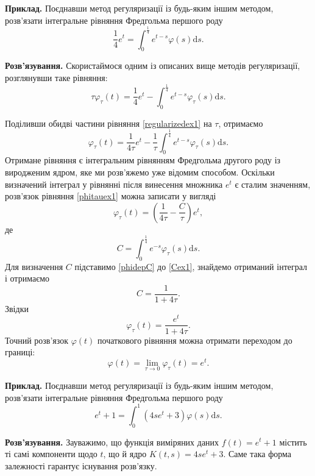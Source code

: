 \documentclass[14pt,twoside]{extreport}
\theoremstyle{mystyle}
\numberwithin{equation}{chapter}
\begin{document}
\begin{small}
\textbf{Приклад.} Поєднавши метод регуляризації із будь-яким іншим методом, розв'язати інтегральне рівняння Фредгольма першого роду
\[
\displaystyle \frac{1}{4}e^{t}=\int_{0}^{\frac{1}{4}}e^{t-s} \varphi(s)\mathrm{d}s.
\]

\textbf{Розв'язування.}
Скористаймося одним із описаних вище методів регуляризації, розглянувши таке рівняння:
\begin{equation}\label{regularizedex1}
 \tau \varphi_{\tau}(t) = \frac{1}{4}e^{t} - \int_{0}^{\frac{1}{4}}e^{t-s} \varphi_{\tau}(s)\mathrm{d}s.
\end{equation}

Поділивши обидві частини рівняння \eqref{regularizedex1} на $\tau$, отримаємо
\begin{equation}\label{phitauex1}
\varphi_{\tau}(t)=\displaystyle \frac{1}{4\tau}e^{t}-\frac{1}{\tau}\int_{0}^{\frac{1}{4}}e^{t-s}\varphi_{\tau}(s)\mathrm{d}s.
\end{equation}
Отримане рівняння є інтегральним рівнянням Фредгольма другого роду із виродженим ядром, яке ми розв'яжемо уже відомим способом. Оскільки визначений інтеграл у рівнянні після винесення множника $e^t$ є сталим значенням, розв'язок рівняння \eqref{phitauex1} можна записати у вигляді
\begin{equation}\label{phidepC}
\varphi_{\tau}(t)=\left(\displaystyle \frac{1}{4\tau}-\frac{C}{\tau}\right)e^{t},
\end{equation}
де
\begin{equation}\label{Cex1}
\displaystyle C=\int_{0}^{\frac{1}{4}}e^{-s}\varphi_{\tau}(s)\mathrm{d}s.
\end{equation}
Для визначення $C$ підставимо \eqref{phidepC} до \eqref{Cex1}, знайдемо отриманий інтеграл і отримаємо
\[
C=\displaystyle \frac{1}{1+4\tau}.
\]
Звідки
\[
\varphi_{\tau}(t)=\displaystyle \frac{e^{t}}{1+4\tau}.
\]
Точний розв'язок $\varphi(t)$ початкового рівняння можна отримати переходом до границі:
\[
\varphi(t)=\displaystyle \lim\limits_{\tau\to 0}\varphi_{\tau}(t)=e^{t}.
\]

\textbf{Приклад.} Поєднавши метод регуляризації із будь-яким іншим методом, розв'язати інтегральне рівняння Фредгольма першого роду
\[
e^{t}+1=\displaystyle \int_{0}^{1}(4se^{t}+3)\varphi(s)\mathrm{d}s.
\]

\textbf{Розв'язування.}
Зауважимо, що функція виміряних даних $f(t)=e^{t}+1$ містить ті самі компоненти щодо $t$, що й ядро $K(t, s)=4se^{t}+3$. Саме така форма залежності гарантує існування розв'язку.


\end{small}
\end{document}
